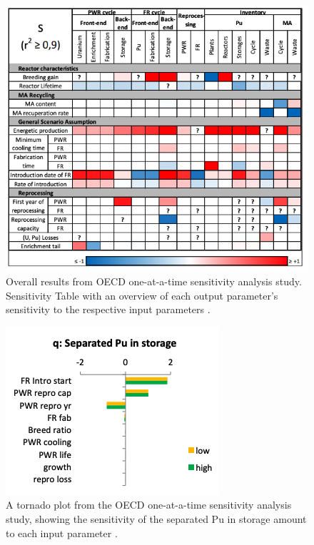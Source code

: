 \begin{figure}[]
	\begin{center}
		\includegraphics[scale=0.6]{./figures/oecd-sensitivitytable.png}
	\end{center}	
        \caption{Overall results from OECD one-at-a-time sensitivity analysis 
        study. Sensitivity Table with an overview of each output parameter's 
        sensitivity to the respective input parameters 
        \cite{noauthor_effects_2017}.}
	\label{fig:oecd-sensitivitytable}
\end{figure}

\begin{figure}[]
	\begin{center}
		\includegraphics[scale=0.75]{./figures/oecd-tornado.png}
	\end{center}	
		\caption{A tornado plot from the OECD one-at-a-time sensitivity analysis 
        study, showing the sensitivity of the separated Pu in 
		storage amount to each input parameter \cite{noauthor_effects_2017}.}
	\label{fig:oecd-tornado}
\end{figure}

